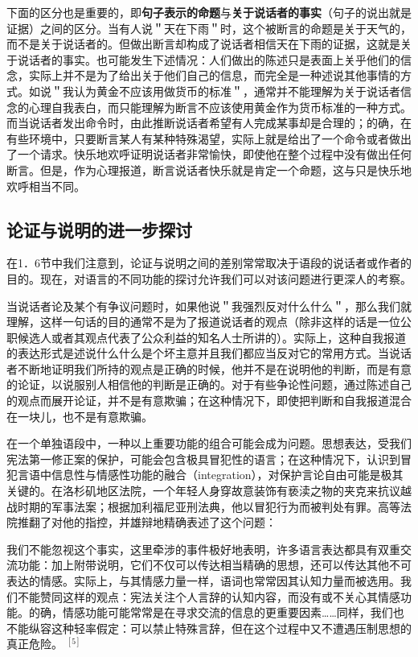 下面的区分也是重要的，即\textbf{句子表示的命题}与\textbf{关于说话者的事实}（句子的说出就是证据）之间的区分。当有人说＂天在下雨＂时，这个被断言的命题是关于天气的，而不是关于说话者的。但做出断言却构成了说话者相信天在下雨的证据，这就是关于说话者的事实。也可能发生下述情况：人们做出的陈述只是表面上关乎他们的信念，实际上并不是为了给出关于他们自己的信息，而完全是一种述说其他事情的方式。如说＂我认为黄金不应该用做货币的标准＂，通常并不能理解为关于说话者信念的心理自我表白，而只能理解为断言不应该使用黄金作为货币标准的一种方式。而当说话者发出命令时，由此推断说话者希望有人完成某事却是合理的；的确，在有些环境中，只要断言某人有某种特殊渴望，实际上就是给出了一个命令或者做出了一个请求。快乐地欢呼证明说话者非常愉快，即使他在整个过程中没有做出任何断言。但是，作为心理报道，断言说话者快乐就是肯定一个命题，这与只是快乐地欢呼相当不同。

\subsection{论证与说明的进一步探讨}

在1．6节中我们注意到，论证与说明之间的差别常常取决于语段的说话者或作者的目的。现在，对语言的不同功能的探讨允许我们可以对该问题进行更深人的考察。

当说话者论及某个有争议问题时，如果他说＂我强烈反对什么什么＂，那么我们就理解，这样一句话的目的通常不是为了报道说话者的观点（除非这样的话是一位公职候选人或者其观点代表了公众利益的知名人士所讲的）。实际上，这种自我报道的表达形式是述说什么什么是个坏主意并且我们都应当反对它的常用方式。当说话者不断地证明我们所持的观点是正确的时候，他并不是在说明他的判断，而是有意的论证，以说服别人相信他的判断是正确的。对于有些争论性问题，通过陈述自己的观点而展开论证，并不是有意欺骗；在这种情况下，即使把判断和自我报道混合在一块儿，也不是有意欺骗。

在一个单独语段中，一种以上重要功能的组合可能会成为问题。思想表达，受我们宪法第一修正案的保护，可能会包含极具冒犯性的语言；在这种情况下，认识到冒犯言语中信息性与情感性功能的融合（integration），对保护言论自由可能是极其关键的。在洛杉矶地区法院，一个年轻人身穿故意装饰有亵渎之物的夹克来抗议越战时期的军事法案；根据加利福尼亚刑法典，他以冒犯行为而被判处有罪。高等法院推翻了对他的指控，并雄辩地精确表述了这个问题：

\begin{displayquote}
我们不能忽视这个事实，这里牵涉的事件极好地表明，许多语言表达都具有双重交流功能：加上附带说明，它们不仅可以传达相当精确的思想，还可以传达其他不可表达的情感。实际上，与其情感力量一样，语词也常常因其认知力量而被选用。我们不能赞同这样的观点：宪法关注个人言辞的认知内容，而没有或不关心其情感功能。的确，情感功能可能常常是在寻求交流的信息的更重要因素……同样，我们也不能纵容这种轻率假定：可以禁止特殊言辞，但在这个过程中又不遭遇压制思想的真正危险。 ${ }^{[5]}$
\end{displayquote}

